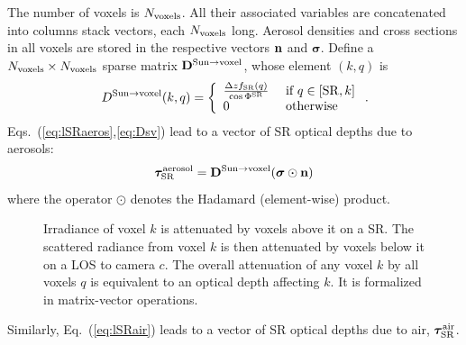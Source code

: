 \documentclass[10pt,twocolumn,letterpaper]{article}
\newcommand{\vect}[1]{\bm{#1}}
\newcommand{\yoavcomment}[1]{}
\renewcommand{\yoavcomment}[1]{#1} %
\begin{document}
The number of voxels is  $N_{\rm voxels}$. All their associated
variables are concatenated into columns stack vectors, each $N_{\rm voxels}$ long. Aerosol densities and cross sections in all voxels are stored in the respective vectors ${\bf n}$ and $\vect{\sigma}$. Define a $N_{\rm voxels}\times N_{\rm voxels}$ sparse matrix ${\bf D}^{\mathrm{Sun \rightarrow voxel}}$, whose
element $(k,q)$ is
\begin{equation}
  D^{\mathrm{Sun \rightarrow voxel}}(k,q) =
  \left\{
      \begin{array}{ll}
          \frac{\Delta zf_{\rm SR}(q)}{\cos\Phi^{\rm SR}}
                & \mbox{ if $q \in[{\rm SR},k]$} \\
          0  & \mbox{ otherwise}
    \label{eq:Dsv}
       \end{array}
  \right.
  .
  \hspace{-0.05cm}
\end{equation}
Eqs.~(\ref{eq:lSRaeros},\ref{eq:Dsv}) lead to a vector of SR optical depths due to aerosols:
\begin{equation}
  \vect{\tau}_{\rm SR}^{\rm aerosol}=
  {\bf D}^{\mathrm{Sun \rightarrow voxel}}
     (\vect{\sigma} \odot {\bf n})
  \label{eq:tauSRvec1}
\end{equation}
where the operator $\odot$ denotes the Hadamard (element-wise) product.
\begin{figure}
  \centering
  \yoavcomment{\def\svgwidth{\columnwidth}}
  \caption{\small
  Irradiance of voxel $k$ is attenuated by voxels above it on a SR. The scattered radiance
  from voxel $k$ is then attenuated by voxels below it on a LOS to camera $c$. The
  overall attenuation of any voxel $k$ by all voxels $q$ is equivalent to an optical depth
  affecting $k$. It is formalized in matrix-vector operations. }
  \label{fig:optidepth}
\end{figure}
Similarly, Eq.~(\ref{eq:lSRair}) leads to a vector of SR optical depths due to air,
$\vect{\tau}_{\rm SR}^{\rm air}$.
\end{document}
